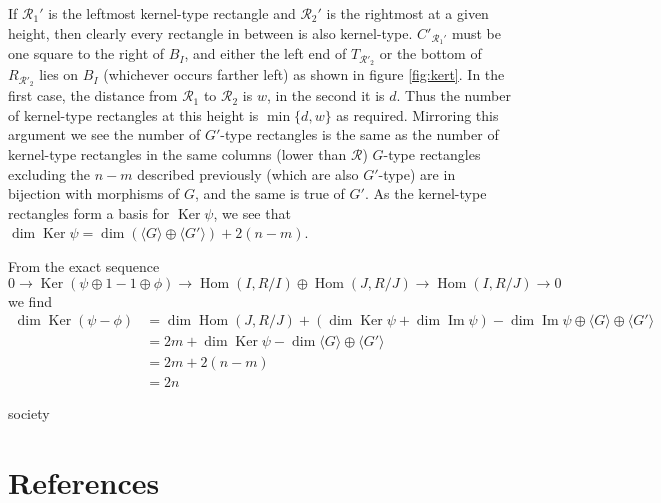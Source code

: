 \documentclass[a4page]{article}
\def\Ker{\operatorname{Ker}}
\def\Hom{\operatorname{Hom}}
\theoremstyle{definition}
\newcommand{\R}{\mathcal{R}}
\DeclareMathOperator{\im}{Im}
\begin{document}
If $\R_1'$ is the leftmost kernel-type rectangle and $\R_2'$ is the rightmost at a given height, then clearly every rectangle in between is also kernel-type.
$C'_{\R_1'}$ must be one square to the right of $B_I$, and either the left end of $T_{\R'_2}$ or the bottom of $R_{\R'_2}$ lies on $B_I$ (whichever occurs farther left) as shown in figure \ref{fig:kert}.
In the first case, the distance from $\R_1$ to $\R_2$ is $w$, in the second it is $d$.
Thus the number of kernel-type rectangles at this height is $\min \{d,w\}$ as required.
Mirroring this argument we see the number of $G'$-type rectangles is the same as the number of kernel-type rectangles in the same columns (lower than $\R$)
$G$-type rectangles excluding the $n-m$ described previously (which are also $G'$-type) are in bijection with morphisms of $G$, and the same is true of $G'$.
As the kernel-type rectangles form a basis for $\Ker \psi$, we see that $\dim \Ker \psi = \dim \left(\langle G \rangle \oplus \langle G' \rangle\right)+2(n-m)$.

From the exact sequence 
\[0 \to \Ker (\psi \oplus 1 - 1 \oplus \phi) \to \Hom(I,R/I)\oplus \Hom(J,R/J) \to \Hom(I,R/J) \to 0\]
we find 
\begin{align*}
\dim \Ker (\psi- \phi) &= \dim \Hom(J,R/J) + (\dim \Ker \psi + \dim \im \psi) - \dim \im \psi \oplus \langle G \rangle \oplus \langle G' \rangle\\
&= 2m + \dim \Ker \psi - \dim \langle G \rangle \oplus \langle G' \rangle\\
&= 2m + 2(n-m)\\
&= 2n
\end{align*}

\newpage

society

\section{References}

\end{document}
